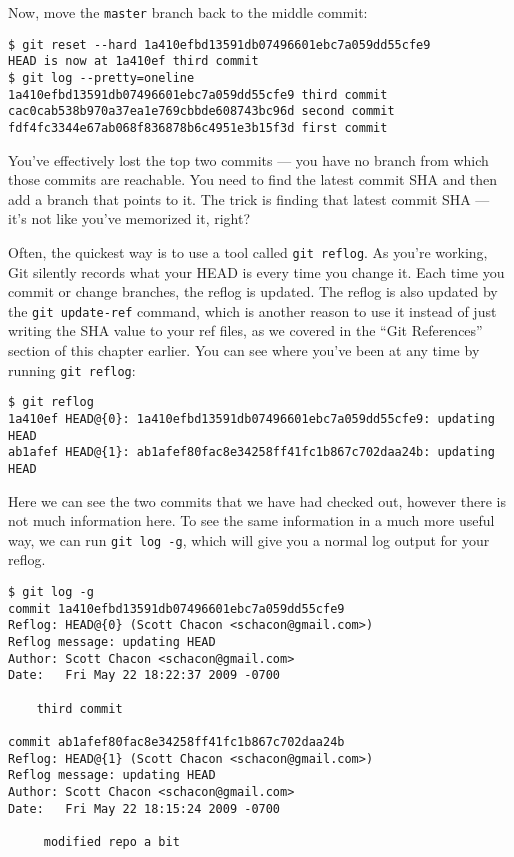 \documentclass[a4paper]{book}
\begin{document}
Now, move the \texttt{master} branch back to the middle commit:

\begin{shaded}\begin{verbatim}
$ git reset --hard 1a410efbd13591db07496601ebc7a059dd55cfe9
HEAD is now at 1a410ef third commit
$ git log --pretty=oneline
1a410efbd13591db07496601ebc7a059dd55cfe9 third commit
cac0cab538b970a37ea1e769cbbde608743bc96d second commit
fdf4fc3344e67ab068f836878b6c4951e3b15f3d first commit
\end{verbatim}\end{shaded}

You've effectively lost the top two commits --- you have no branch from which those commits are reachable. You need to find the latest commit SHA and then add a branch that points to it. The trick is finding that latest commit SHA --- it's not like you've memorized it, right?

Often, the quickest way is to use a tool called \texttt{git reflog}. As you're working, Git silently records what your HEAD is every time you change it. Each time you commit or change branches, the reflog is updated. The reflog is also updated by the \texttt{git update-ref} command, which is another reason to use it instead of just writing the SHA value to your ref files, as we covered in the “Git References” section of this chapter earlier. You can see where you've been at any time by running \texttt{git reflog}:

\begin{shaded}\begin{verbatim}
$ git reflog
1a410ef HEAD@{0}: 1a410efbd13591db07496601ebc7a059dd55cfe9: updating HEAD
ab1afef HEAD@{1}: ab1afef80fac8e34258ff41fc1b867c702daa24b: updating HEAD
\end{verbatim}\end{shaded}

Here we can see the two commits that we have had checked out, however there is not much information here. To see the same information in a much more useful way, we can run \texttt{git log -g}, which will give you a normal log output for your reflog.

\begin{shaded}\begin{verbatim}
$ git log -g
commit 1a410efbd13591db07496601ebc7a059dd55cfe9
Reflog: HEAD@{0} (Scott Chacon <schacon@gmail.com>)
Reflog message: updating HEAD
Author: Scott Chacon <schacon@gmail.com>
Date:   Fri May 22 18:22:37 2009 -0700

    third commit

commit ab1afef80fac8e34258ff41fc1b867c702daa24b
Reflog: HEAD@{1} (Scott Chacon <schacon@gmail.com>)
Reflog message: updating HEAD
Author: Scott Chacon <schacon@gmail.com>
Date:   Fri May 22 18:15:24 2009 -0700

     modified repo a bit
\end{verbatim}\end{shaded}
\end{document}
